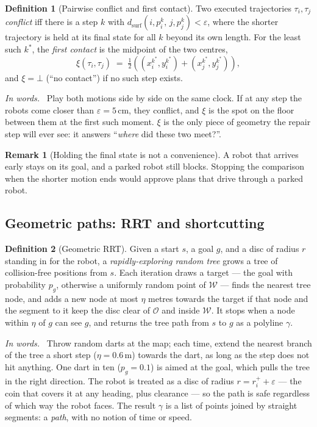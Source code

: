 \documentclass[conference]{IEEEtran}
\theoremstyle{plain}
\theoremstyle{definition}
\newtheorem{definition}{Definition}
\newtheorem{remark}{Remark}
\newcommand{\inwords}{\par\smallskip\noindent\textit{In words.}\ }
\newcommand{\W}{\mathcal{W}}
\newcommand{\Obs}{\mathcal{O}}
\newcommand{\clr}{\varepsilon}
\begin{document}
\begin{definition}[Pairwise conflict and first contact]
\label{def:conflict}
Two executed trajectories $\tau_i,\tau_j$ \emph{conflict} iff there is a step $k$ with
$d_{\text{surf}}(i,p_i^k,\,j,p_j^k) < \clr$, where the shorter trajectory is held at its
final state for all $k$ beyond its own length. For the least such $k^\ast$, the \emph{first
contact} is the midpoint of the two centres,
\begin{equation}
  \xi(\tau_i,\tau_j) \;=\; \tfrac12\!\left( (x_i^{k^\ast},y_i^{k^\ast}) +
                                            (x_j^{k^\ast},y_j^{k^\ast}) \right),
  \label{eq:xi}
\end{equation}
and $\xi = \bot$ (``no contact'') if no such step exists.
\inwords
Play both motions side by side on the same clock. If at any step the robots come closer than
$\clr = 5$\,cm, they conflict, and $\xi$ is the spot on the floor between them at the first
such moment. $\xi$ is the only piece of geometry the repair step will ever see: it answers
``\emph{where} did these two meet?''.
\end{definition}

\begin{remark}[Holding the final state is not a convenience]
A robot that arrives early stays on its goal, and a parked robot still blocks. Stopping the
comparison when the shorter motion ends would approve plans that drive through a parked
robot.
\end{remark}

\subsection{Geometric paths: RRT and shortcutting}
\label{sec:prelim-paths}

\begin{definition}[Geometric RRT]
\label{def:rrt}
Given a start $s$, a goal $g$, and a disc of radius $r$ standing in for the robot, a
\emph{rapidly-exploring random tree} \cite{lavalle2001} grows a tree of collision-free
positions from $s$. Each iteration draws a target --- the goal with probability $p_g$,
otherwise a uniformly random point of $\W$ --- finds the nearest tree node, and adds a new
node at most $\eta$ metres towards the target if that node and the segment to it keep the
disc clear of $\Obs$ and inside $\W$. It stops when a node within $\eta$ of $g$ can see $g$,
and returns the tree path from $s$ to $g$ as a polyline $\gamma$.
\inwords
Throw random darts at the map; each time, extend the nearest branch of the tree a short step
($\eta = 0.6$\,m) towards the dart, as long as the step does not hit anything. One dart in
ten ($p_g = 0.1$) is aimed at the goal, which pulls the tree in the right direction. The
robot is treated as a disc of radius $r = r^{+}_i + \clr$ --- the coin that covers it at any
heading, plus clearance --- so the path is safe regardless of which way the robot faces.
The result $\gamma$ is a list of points joined by straight segments: a \emph{path}, with no
notion of time or speed.
\end{definition}
\end{document}

